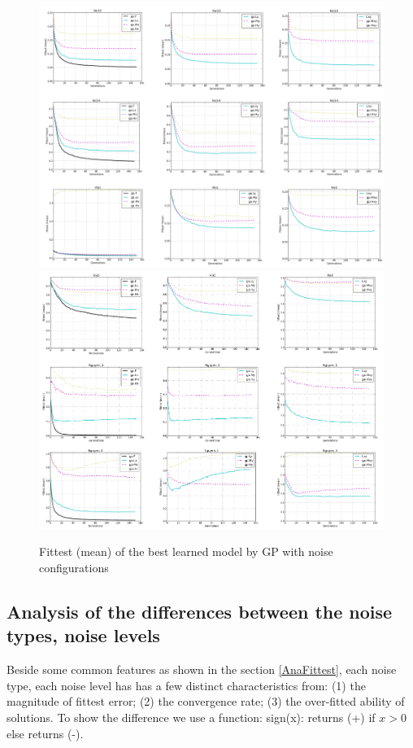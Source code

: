 \begin{figure}
  \includegraphics[width=1.0\textwidth]{Figures/Figure7.png}
  \includegraphics[width=1.0\textwidth]{Figures/Figure8.png}
\caption{Fittest (mean) of the best learned model by GP with noise configurations}
\label{fig:Fittest}       %
\end{figure}
\subsection {Analysis of the differences between the noise types, noise levels}
\label{AnaDiff}
Beside some common features as shown in the section \ref{AnaFittest}, each noise type, each noise level has has a few distinct characteristics from: (1) the magnitude of fittest error; (2) the convergence rate; (3) the over-fitted ability of solutions. To show the difference we use a function: sign(x): returns (+) if $x>0$ else returns (-).
